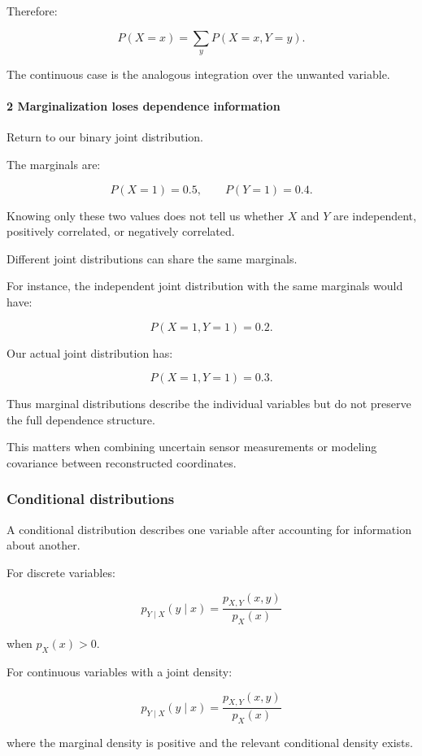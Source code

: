 Therefore:

\[
 P(X=x)=\sum_yP(X=x,Y=y).
\]

The continuous case is the analogous integration over the unwanted variable.

\paragraph{2 Marginalization loses dependence information}\label{marginalization-loses-dependence-information}

Return to our binary joint distribution.

The marginals are:

\[
 P(X=1)=0.5, \qquad P(Y=1)=0.4.
\]

Knowing only these two values does not tell us whether \(X\) and \(Y\) are independent, positively correlated, or negatively correlated.

Different joint distributions can share the same marginals.

For instance, the independent joint distribution with the same marginals would have:

\[
 P(X=1,Y=1)=0.2.
\]

Our actual joint distribution has:

\[
 P(X=1,Y=1)=0.3.
\]

Thus marginal distributions describe the individual variables but do not preserve the full dependence structure.

This matters when combining uncertain sensor measurements or modeling covariance between reconstructed coordinates.

\subsubsection{Conditional distributions}\label{conditional-distributions}

A conditional distribution describes one variable after accounting for information about another.

For discrete variables:

\[
 \boxed{ p_{Y\mid X}(y\mid x) = \frac{p_{X,Y}(x,y)}{p_X(x)} }
\]

when \(p_X(x)>0\).

For continuous variables with a joint density:

\[
 \boxed{ p_{Y\mid X}(y\mid x) = \frac{p_{X,Y}(x,y)}{p_X(x)} }
\]

where the marginal density is positive and the relevant conditional density exists.

